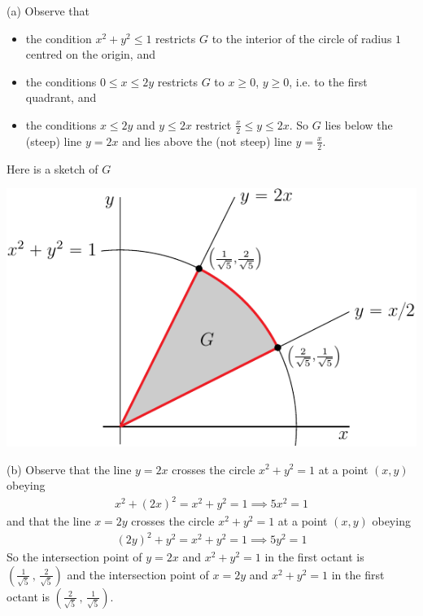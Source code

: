 \begin{solution}
(a) Observe that
\begin{itemize}
\item
the condition $x^2+y^2\le 1$ restricts $G$ to the interior of the 
circle of radius $1$ centred on the origin, and
\item
the conditions $0\le x\le 2y$ restricts $G$ to $x\ge 0$, $y\ge 0$,
i.e. to the first quadrant, and
\item
the conditions $x\le 2y$ and $y\le 2x$ restrict $\frac{x}{2}\le y\le 2x$.
So $G$ lies below the (steep) line $y=2x$ and lies above the (not steep)
line $y=\frac{x}{2}$. 
\end{itemize}
Here is a sketch of $G$

\begin{center}
     \includegraphics{fig/OE10A_5.pdf}
\end{center}

(b) Observe that the line $y=2x$ crosses the circle $x^2+y^2=1$ at
a point $(x,y)$ obeying
\begin{align*}
x^2+(2x)^2=x^2+y^2=1
\implies 5x^2=1
\end{align*}
and that the line $x=2y$ crosses the circle $x^2+y^2=1$ at
a point $(x,y)$ obeying
\begin{align*}
(2y)^2+y^2=x^2+y^2=1
\implies 5y^2=1
\end{align*}
So the intersection point of $y=2x$ and $x^2+y^2=1$ in the first octant
is $\left(\frac{1}{\sqrt{5}}\,,\,\frac{2}{\sqrt{5}}\right)$ and 
the intersection point of $x=2y$ and $x^2+y^2=1$ in the first octant
is $\left(\frac{2}{\sqrt{5}}\,,\,\frac{1}{\sqrt{5}}\right)$.


\end{solution}
